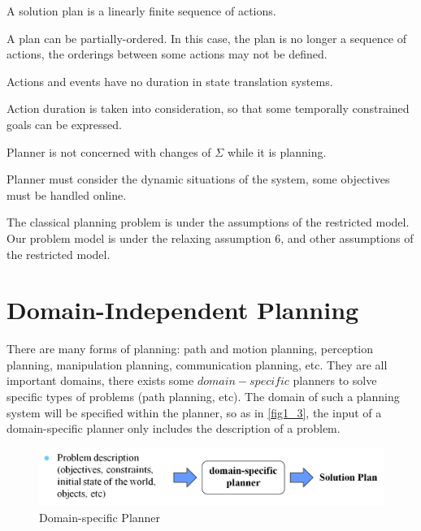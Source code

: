 \begin{assumption}
A solution plan is a linearly finite sequence of actions.
\end{assumption}

\begin{r_assum}
A plan can be partially-ordered. In this case, the plan is no longer a sequence of actions, the orderings between some actions may not be defined.
\end{r_assum}

\begin{assumption}
Actions and events have no duration in state translation systems.
\end{assumption}

\begin{r_assum}
Action duration is taken into consideration, so that some temporally constrained goals can be expressed.
\end{r_assum}

\begin{assumption}
Planner is not concerned with changes of $\Sigma$ while it is planning.
\end{assumption}

\begin{r_assum}
Planner must consider the dynamic situations of the system, some objectives must be handled online.
\end{r_assum}

The classical planning problem is under the assumptions of the restricted model. Our problem model is under the relaxing assumption 6, and other assumptions of the restricted model.

\section{Domain-Independent Planning}
There are many forms of planning: path and motion planning, perception planning, manipulation planning, communication planning, etc. They are all important domains, there exists some $domain-specific$ planners to solve specific types of problems (path planning, etc). The domain of such a planning system will be specified within the planner, so as in \autoref{fig1_3}, the input of a domain-specific planner only includes the description of a problem.

\begin{figure}[H]
    \center
    \includegraphics[width=\textwidth]{./images/1_3.png}
    \caption{Domain-specific Planner}
    \label{fig1_3}
\end{figure}

